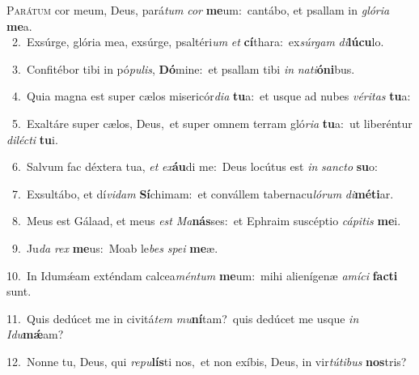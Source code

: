 \lettrine{\initial\textcolor{\initialcolor}{P}}{arátum} cor meum, Deus, pará\textit{tum} \textit{cor} \textbf{me}\-um:~\star cantábo, et psallam in \textit{gló}\-\textit{ri}\textit{a} \textbf{me}\-a.\\
{\numbfont\textcolor{\numbcolor}{~2.}}~Exsúrge, glória mea, exsúrge, psaltéri\textit{um} \textit{et} \textbf{cí}\-thara:~\star ex\-\textit{súr}\-\textit{gam} \textit{di}\-\textbf{lú}\textbf{cu}lo.\par
{\numbfont\textcolor{\numbcolor}{~3.}}~Confitébor tibi in pó\-\textit{pu}\-\textit{lis}, \textbf{Dó}\-mine:~\star et psallam tibi \textit{in} \textit{na}\-\textit{ti}\textbf{ó}\textbf{ni}bus.\par
{\numbfont\textcolor{\numbcolor}{~4.}}~Quia magna est super cælos misericór\-\textit{di}\-\textit{a} \textbf{tu}\-a:~\star et usque ad nubes \textit{vé}\-\textit{ri}\textit{tas} \textbf{tu}\-a:\par
{\numbfont\textcolor{\numbcolor}{~5.}}~Exaltáre super cælos, Deus,~\dagger et super omnem terram gló\-\textit{ri}\-\textit{a} \textbf{tu}\-a:~\star ut liberéntur \textit{di}\-\textit{léc}\textit{ti} \textbf{tu}\-i.\par
{\numbfont\textcolor{\numbcolor}{~6.}}~Salvum fac déxtera tua, \textit{et} \textit{ex}\-\textbf{áu}di me:~\star Deus locútus est \textit{in} \textit{sanc}\-\textit{to} \textbf{su}\-o:\par
{\numbfont\textcolor{\numbcolor}{~7.}}~Exsultábo, et dí\-\textit{vi}\-\textit{dam} \textbf{Sí}\-chimam:~\star et convállem tabernacu\-\textit{ló}\-\textit{rum} \textit{di}\-\textbf{mé}\textbf{ti}ar.\par
{\numbfont\textcolor{\numbcolor}{~8.}}~Meus est Gálaad, et meus \textit{est} \textit{Ma}\-\textbf{nás}ses:~\star et Ephraim suscéptio \textit{cá}\-\textit{pi}\textit{tis} \textbf{me}\-i.\par
{\numbfont\textcolor{\numbcolor}{~9.}}~Ju\textit{da} \textit{rex} \textbf{me}\-us:~\star Moab le\textit{bes} \textit{spe}\-\textit{i} \textbf{me}\-æ.\par
{\numbfont\textcolor{\numbcolor}{10.}}~In Idumǽam exténdam calcea\-\textit{mén}\-\textit{tum} \textbf{me}\-um:~\star mihi alienígenæ \textit{a}\-\textit{mí}\textit{ci} \textbf{fac}\-\textbf{ti} sunt.\par
{\numbfont\textcolor{\numbcolor}{11.}}~Quis dedúcet me in civitá\textit{tem} \textit{mu}\-\textbf{ní}tam?~\star quis dedúcet me usque \textit{in} \textit{I}\-\textit{du}\textbf{mǽ}am?\par
{\numbfont\textcolor{\numbcolor}{12.}}~Nonne tu, Deus, qui \textit{re}\-\textit{pu}\textbf{lís}ti nos,~\star et non exíbis, Deus, in vir\-\textit{tú}\-\textit{ti}\textit{bus} \textbf{nos}\-tris?\par
